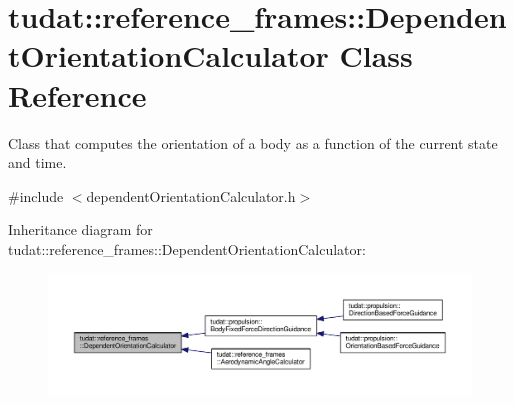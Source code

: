 \hypertarget{classtudat_1_1reference__frames_1_1DependentOrientationCalculator}{}\section{tudat\+:\+:reference\+\_\+frames\+:\+:Dependent\+Orientation\+Calculator Class Reference}
\label{classtudat_1_1reference__frames_1_1DependentOrientationCalculator}


Class that computes the orientation of a body as a function of the current state and time.  




{\ttfamily \#include $<$dependent\+Orientation\+Calculator.\+h$>$}



Inheritance diagram for tudat\+:\+:reference\+\_\+frames\+:\+:Dependent\+Orientation\+Calculator\+:
\nopagebreak
\begin{figure}[H]
\begin{center}
\leavevmode
\includegraphics[width=350pt]{classtudat_1_1reference__frames_1_1DependentOrientationCalculator__inherit__graph}
\end{center}
\end{figure}
